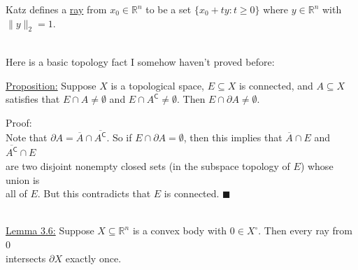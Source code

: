 \documentclass{book}
\newcommand{\hTwo}{%
\color{Black}%
   \fontsize{13}{15}\selectfont%
}
\newcommand{\pracOne}{
   \color{BrickRed}%
   \fontsize{13}{15}\selectfont%
}
\newcommand{\pracTwo}{
   \color{Orange}%
   \fontsize{12}{14}\selectfont%
}
\newcommand{\exTwo}{%
   \color{Purple}%
   \fontsize{13}{15}\selectfont%
}
\newenvironment{myIndent}{%
   \begin{adjustwidth}{2.5em}{0em}%
}{%
   \end{adjustwidth}%
}
\newcommand{\udefine}[1]{{%
   \setulcolor{Red}%
   \setul{0.14em}{0.07em}%
   \ul{#1}%
}}
\newcommand{\comp}{\mathsf{C}}
\newcommand{\mySepTwo}[1][.]{%
   {\noindent\color{#1}{\rule{6.5in}{0.5mm}}}\\%
}
\newcommand{\retTwo}{\hfill\bigbreak}
\begin{document}
\hTwo Katz defines a \udefine{ray} from $x_0 \in \mathbb{R}^n$ to be a set $\{x_0 + ty : t \geq 0\}$ where $y \in \mathbb{R}^n$ with $\|y\|_2 = 1$.\retTwo

\pracOne\mySepTwo
Here is a basic topology fact I somehow haven't proved before:\retTwo

\ul{Proposition:} Suppose $X$ is a topological space, $E \subseteq X$ is connected, and $A \subseteq X$ satisfies that $E \cap A \neq \emptyset$ and $E \cap A^\comp \neq \emptyset$. Then $E \cap \partial A \neq \emptyset$.
\begin{myIndent}\pracTwo
	Proof:\\
	Note that $\partial A = \overline{A} \cap \overline{A^\comp}$. So if $E \cap \partial A = \emptyset$, then this implies that $\overline{A} \cap E$ and $\overline{A^\comp} \cap E$\\ are two disjoint nonempty closed sets (in the subspace topology of $E$) whose union is\\ all of $E$. But this contradicts that $E$ is connected. $\blacksquare$
\end{myIndent}
\mySepTwo

\exTwo\ul{Lemma 3.6:} Suppose $X \subseteq \mathbb{R}^n$ is a convex body with $0 \in X^\circ$. Then every ray from $0$\\ intersects $\partial X$ exactly once.
\end{document}

